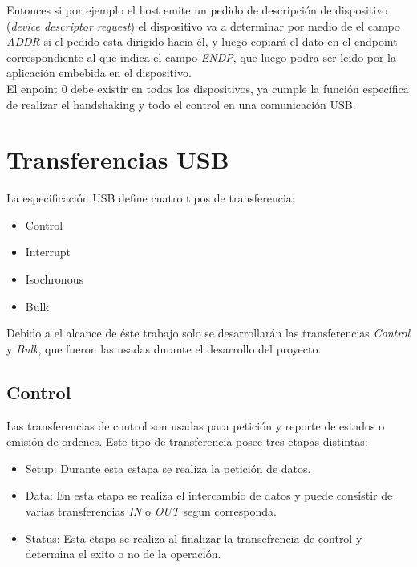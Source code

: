 Entonces si por ejemplo el host emite un pedido de descripci\'on de dispositivo
(\emph{device descriptor request}) el dispositivo va a determinar por medio de
el campo \emph{ADDR} si el pedido esta dirigido hacia \'el, y luego copiar\'a
el dato en el endpoint correspondiente al que indica el campo \emph{ENDP}, que
luego podra ser leido por la aplicaci\'on embebida en el dispositivo.\\

El enpoint 0 debe existir en todos los dispositivos, ya cumple la funci\'on
espec\'ifica de realizar el handshaking y todo el control en una
comunicaci\'on USB. 


\clearpage
\section{Transferencias USB}
La especificaci\'on USB define cuatro tipos de transferencia:

\begin{itemize}
 \item Control
 \item Interrupt
 \item Isochronous 
 \item Bulk
\end{itemize}

Debido a el alcance de \'este trabajo solo se desarrollar\'an las
transferencias \emph{Control} y \emph{Bulk}, que fueron las usadas durante el
desarrollo del proyecto.


\subsection{Control}
Las transferencias de control son usadas para petici\'on y reporte de estados o
emisi\'on de ordenes. Este tipo de transferencia posee tres etapas distintas:

\begin{itemize}
 \item Setup:
		Durante esta estapa se realiza la petici\'on de datos.
 \item Data:
		En esta etapa se realiza el intercambio de datos y puede consistir de
varias transferencias \emph{IN} o \emph{OUT} segun corresponda. 
 \item Status:
		Esta etapa se realiza al finalizar la transefrencia de control y
determina el exito o no de la operaci\'on.
\end{itemize}


